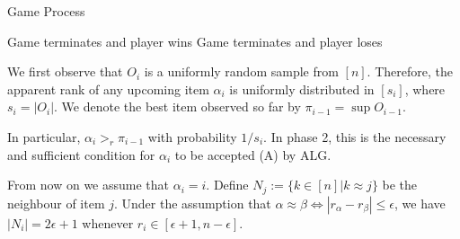 \documentclass{article}
\begin{document}
\begin{algorithm}
\caption{Game Process}
\label{algo1} 
\begin{algorithmic}[1]







			\State Game terminates and player wins
		\Else
			\State Game terminates and player loses
			\EndIf
			
		
	\EndIf
	
	
\EndFor

\end{algorithmic}
\end{algorithm}

\pagebreak

\newcommand{\ALG}{\text{ALG}}
\newcommand{\BestSoFar}{\pi_{i-1}}

We first observe that $O_i$ is a uniformly random sample from $[n]$. Therefore, the apparent rank of any upcoming item $\alpha_i$ is uniformly distributed in $[s_i]$, where $s_i = |O_i|$. We denote the best item observed so far by $\BestSoFar = \sup O_{i-1}$.

In particular, $\alpha_i >_r \BestSoFar$ with probability $1/s_i$. In phase 2, this is the necessary and sufficient condition for $\alpha_i$ to be accepted (A) by $\ALG$.

From now on we assume that $\alpha_i = i$. Define $N_j := \{k\in[n] | k \approx j\}$ be the neighbour of item $j$. Under the assumption that $\alpha \approx \beta \iff |r_\alpha - r_\beta|\leq \epsilon$, we have $|N_i|=2 \epsilon + 1$ whenever $r_i \in [\epsilon+1, n-\epsilon]$.
\end{document}
